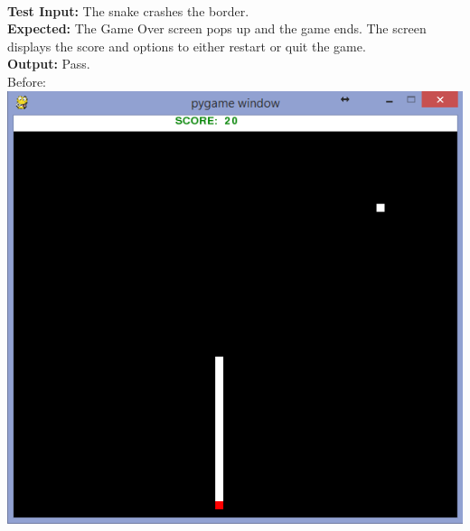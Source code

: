 \documentclass[12pt]{article}
\begin{document}
\\
\textbf{Test Input:} The snake crashes the border.\\
\textbf{Expected:} The Game Over screen pops up and the game ends. The screen displays the score and options to either restart or quit the game.\\
\textbf{Output:} Pass.\\
Before: \pagebreak\includegraphics[width=\textwidth]{startgame.png}\\
\end{document}
